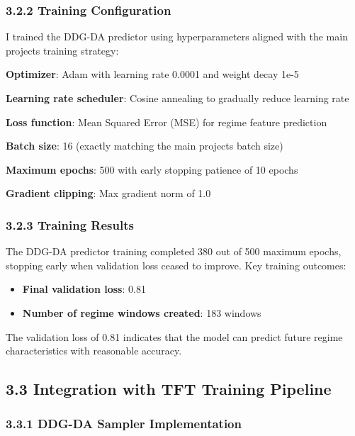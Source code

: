 \documentclass[
]{article}
\begin{document}
\subsubsection{3.2.2 Training
Configuration}\label{322-training-configuration}

I trained the DDG-DA predictor using hyperparameters aligned with the
main project\textquotesingle s training strategy:

\textbf{Optimizer}: Adam with learning rate 0.0001 and weight decay 1e-5

\textbf{Learning rate scheduler}: Cosine annealing to gradually reduce
learning rate

\textbf{Loss function}: Mean Squared Error (MSE) for regime feature
prediction

\textbf{Batch size}: 16 (exactly matching the main
project\textquotesingle s batch size)

\textbf{Maximum epochs}: 500 with early stopping patience of 10 epochs

\textbf{Gradient clipping}: Max gradient norm of 1.0

\subsubsection{3.2.3 Training Results}\label{323-training-results}

The DDG-DA predictor training completed 380 out of 500 maximum epochs,
stopping early when validation loss ceased to improve. Key training
outcomes:

\begin{itemize}
\item
  \textbf{Final validation loss}: 0.81
\item
  \textbf{Number of regime windows created}: 183 windows
\end{itemize}

The validation loss of 0.81 indicates that the model can predict future
regime characteristics with reasonable accuracy.

\subsection{3.3 Integration with TFT Training
Pipeline}\label{33-integration-with-tft-training-pipeline}

\subsubsection{3.3.1 DDG-DA Sampler
Implementation}\label{331-ddg-da-sampler-implementation}
\end{document}
